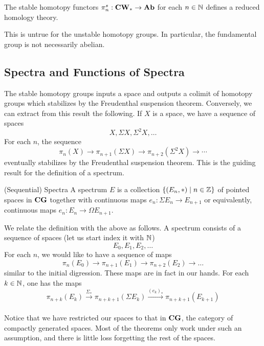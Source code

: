 \documentclass[a4paper]{article}
\begin{document}
\begin{thm}{}{} The stable homotopy functors $\pi_n^s:\bold{CW}_\ast\to\bold{Ab}$ for each $n\in\mathbb{N}$ defines a reduced homology theory. 
\end{thm}

This is untrue for the unstable homotopy groups. In particular, the fundamental group is not necessarily abelian. 

\subsection{Spectra and Functions of Spectra}
The stable homotopy groups inputs a space and outputs a colimit of homotopy groups which stabilizes by the Freudenthal suspension theorem. Conversely, we can extract from this result the following. If $X$ is a space, we have a sequence of spaces $$X,\Sigma X,\Sigma^2X,\dots$$ For each $n$, the sequence $$\pi_n(X)\to\pi_{n+1}(\Sigma X)\to\pi_{n+2}(\Sigma^2X)\to\cdots$$ eventually stabilizes by the Freudenthal suspension theorem. This is the guiding result for the definition of a spectrum. 

\begin{defn}{(Sequential) Spectra}{} A spectrum $E$ is a collection $\{(E_n,\ast)\;|\;n\in\mathbb{Z}\}$ of pointed spaces in $\bold{CG}$ together with continuous maps $e_n:\Sigma E_n\to E_{n+1}$ or equivalently, continuous maps $e_n:E_n\to\Omega E_{n+1}$. 
\end{defn}

We relate the definition with the above as follows. A spectrum consists of a sequence of spaces (let us start index it with $\mathbb{N}$) $$E_0,E_1,E_2,\dots$$ For each $n$, we would like to have a sequence of maps $$\pi_n(E_0)\to\pi_{n+1}(E_1)\to\pi_{n+2}(E_2)\to\dots$$ similar to the initial digression. These maps are in fact in our hands. For each $k\in\mathbb{N}$, one has the maps $$\pi_{n+k}(E_k)\overset{\Sigma_\ast}{\to}\pi_{n+k+1}(\Sigma E_k)\overset{(e_k)_\ast}{\to}\pi_{n+k+1}(E_{k+1})$$~\\

Notice that we have restricted our spaces to that in $\bold{CG}$, the category of compactly generated spaces. Most of the theorems only work under such an assumption, and there is little loss forgetting the rest of the spaces. 
\end{document}
